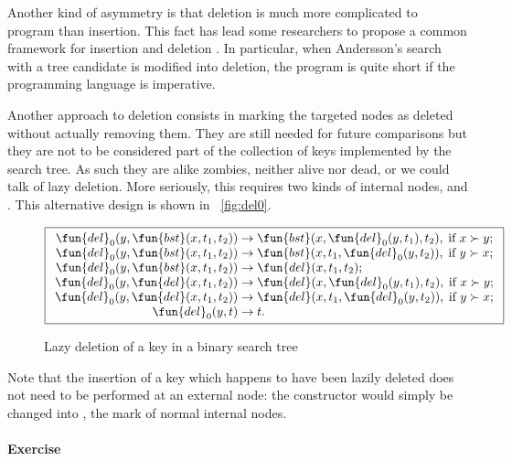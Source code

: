 Another kind of asymmetry is that deletion is much more complicated to
program than insertion. This fact has lead some researchers to propose
a common framework for insertion and deletion
\citep{Andersson_1991,Hinze_2002}. In particular, when Andersson's
search with a tree candidate is modified into deletion, the program is
quite short if the programming language is imperative.

Another approach to deletion consists in marking the targeted nodes as
deleted without actually removing them. They are still needed for
future comparisons but they are not to be considered part of the
collection of keys implemented by the search tree. As such they are
alike zombies, neither alive nor dead, or we could talk of lazy
deletion. More seriously, this requires two kinds of internal nodes,
 and . This alternative
design is shown in \fig~\vref{fig:del0}.
\begin{figure}[!t]
\begin{equation*}
\boxed{
\begin{array}{r@{\;}l@{\;}l}
  \fun{del}_0(y,\fun{bst}(x,t_1,t_2)) & \rightarrow &
  \fun{bst}(x,\fun{del}_0(y,t_1),t_2),\; \text{if \(x \succ y\)};\\
\fun{del}_0(y,\fun{bst}(x,t_1,t_2)) & \rightarrow &
  \fun{bst}(x,t_1,\fun{del}_0(y,t_2)),\; \text{if \(y \succ x\)};\\
\fun{del}_0(y,\fun{bst}(x,t_1,t_2)) & \rightarrow &
  \fun{del}(x,t_1,t_2);\\
\fun{del}_0(y,\fun{del}(x,t_1,t_2)) & \rightarrow &
  \fun{del}(x,\fun{del}_0(y,t_1),t_2),\; \text{if \(x \succ y\)};\\
\fun{del}_0(y,\fun{del}(x,t_1,t_2)) & \rightarrow &
  \fun{del}(x,t_1,\fun{del}_0(y,t_2)),\; \text{if \(y \succ x\)};\\
\fun{del}_0(y,t) & \rightarrow & t.\\
\end{array}}
\end{equation*}
\caption{Lazy deletion of a key in a binary search tree}
\label{fig:del0}
\end{figure}
Note that the insertion of a key which happens to have been lazily
deleted does not need to be performed at an external node: the
constructor  would simply be changed into , the
mark of normal internal nodes.

\paragraph{Exercise}

